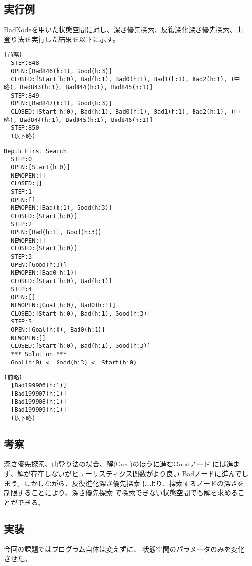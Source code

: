 \documentclass{jarticle}
\begin{document}
\subsection{実行例}
BadNodeを用いた状態空間に対し、深さ優先探索、反復深化深さ優先探索、山登り法を実行した結果を以下に示す。

\begin{lstlisting}[caption=深さ優先探索]
  (前略)
  STEP:848
  OPEN:[Bad846(h:1), Good(h:3)]
  CLOSED:[Start(h:0), Bad(h:1), Bad0(h:1), Bad1(h:1), Bad2(h:1), (中略), Bad843(h:1), Bad844(h:1), Bad845(h:1)]
  STEP:849
  OPEN:[Bad847(h:1), Good(h:3)]
  CLOSED:[Start(h:0), Bad(h:1), Bad0(h:1), Bad1(h:1), Bad2(h:1), (中略), Bad844(h:1), Bad845(h:1), Bad846(h:1)]
  STEP:850
  (以下略)
  \end{lstlisting}

\begin{lstlisting}[caption=反復深化深さ優先探索]
  Depth First Search
  STEP:0
  OPEN:[Start(h:0)]
  NEWOPEN:[]
  CLOSED:[]
  STEP:1
  OPEN:[]
  NEWOPEN:[Bad(h:1), Good(h:3)]
  CLOSED:[Start(h:0)]
  STEP:2
  OPEN:[Bad(h:1), Good(h:3)]
  NEWOPEN:[]
  CLOSED:[Start(h:0)]
  STEP:3
  OPEN:[Good(h:3)]
  NEWOPEN:[Bad0(h:1)]
  CLOSED:[Start(h:0), Bad(h:1)]
  STEP:4
  OPEN:[]
  NEWOPEN:[Goal(h:0), Bad0(h:1)]
  CLOSED:[Start(h:0), Bad(h:1), Good(h:3)]
  STEP:5
  OPEN:[Goal(h:0), Bad0(h:1)]
  NEWOPEN:[]
  CLOSED:[Start(h:0), Bad(h:1), Good(h:3)]
  *** Solution ***
  Goal(h:0) <- Good(h:3) <- Start(h:0)
  \end{lstlisting}

\begin{lstlisting}[caption=山登り法]
  (前略)
  [Bad199906(h:1)]
  [Bad199907(h:1)]
  [Bad199908(h:1)]
  [Bad199909(h:1)]
  (以下略)
  \end{lstlisting}

\subsection{考察}
深さ優先探索、山登り法の場合、解(Goal)のほうに進むGoodノード
には進まず、解が存在しないがヒューリスティクス関数がより良い
Badノードに進んでしまう。しかしながら、反復進化深さ優先探索
により、探索するノードの深さを制限することにより、深さ優先探索
で探索できない状態空間でも解を求めることができる。

\subsection{実装}
今回の課題ではプログラム自体は変えずに、
状態空間のパラメータのみを変化させた。
\end{document}
